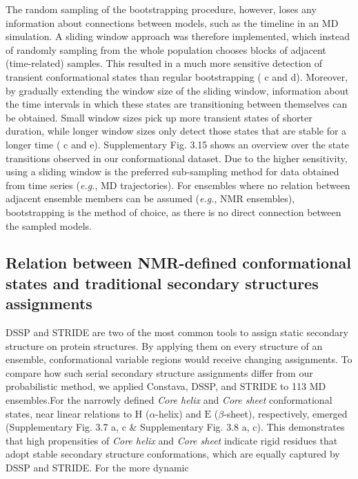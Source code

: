 The random sampling of the bootstrapping procedure, however, loses any information about connections between models, such as the timeline in an MD simulation. A sliding window approach was therefore implemented, which instead of randomly sampling from the whole population chooses blocks of adjacent (time-related) samples. This resulted in a much more sensitive detection of transient conformational states than regular bootstrapping ( c and d). Moreover, by gradually extending the window size of the sliding window, information about the time intervals in which these states are transitioning between themselves can be obtained. Small window sizes pick up more transient states of shorter duration, while longer window sizes only detect those states that are stable for a longer time ( c and e). 
Supplementary Fig. 3.15 shows an overview over the state transitions observed in our conformational dataset. Due to the higher sensitivity, using a sliding window is the preferred sub-sampling method for data obtained from time series (\textit{e.g.}, MD trajectories). For ensembles where no relation between adjacent ensemble members can be assumed (\textit{e.g.}, NMR ensembles), bootstrapping is the method of choice, as there is no direct connection between the sampled models.

\subsection{Relation between NMR-defined conformational states and traditional secondary structures assignments} 
\label{section:DSSP_vs_constava}


\parfillskip=0pt
DSSP \cite{touw_series_2015,kabsch_dictionary_1983} and STRIDE \cite{lovell_structure_2003,frishman_knowledge-based_1995} are two of the most common tools to assign static secondary structure on protein structures. By applying them on every structure of an ensemble, conformational variable regions would receive changing assignments. To compare how such serial secondary structure assignments differ from our probabilistic method, we applied Constava, DSSP, and STRIDE to 113 MD ensembles.For the narrowly defined \textit{Core helix} and \textit{Core sheet} conformational states, near linear relations to $\text{H}$ ($\alpha$-helix) and $\text{E}$ ($\beta$-sheet), respectively, emerged (Supplementary Fig. 3.7 a, c \& Supplementary Fig. 3.8 a, c).
This demonstrates that high propensities of \textit{Core helix} and \textit{Core sheet} indicate rigid residues that adopt stable secondary structure conformations, which are equally captured by DSSP and STRIDE. For the more dynamic\hfill

